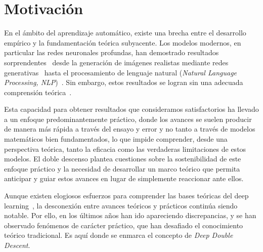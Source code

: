 \section{Motivación}

En el ámbito del aprendizaje automático, existe una brecha entre el desarrollo empírico y la fundamentación teórica subyacente. Los modelos modernos, en particular las redes neuronales profundas, han demostrado resultados sorprendentes~\cite{Sejnowski2020TheUE, He2020RecentAI} desde la generación de imágenes realistas mediante redes generativas~\cite{Elasri2022, Ruthotto2021} hasta el procesamiento de lenguaje natural (\textit{Natural Language Processing, NLP})~\cite{Kamath2019, Lauriola2022}. Sin embargo, estos resultados se logran sin una adecuada comprensión teórica~\cite{Ben-David2009, Grohs2022}.\newline

Esta capacidad para obtener resultados que consideramos satisfactorios ha llevado a un enfoque predominantemente práctico, donde los avances se suelen producir de manera más rápida a través del ensayo y error y no tanto a través de modelos matemáticos bien fundamentados, lo que impide comprender, desde una perspectiva teórica, tanto la eficacia como las verdaderas limitaciones de estos modelos. El doble descenso plantea cuestiones sobre la sostenibilidad de este enfoque práctico y la necesidad de desarrollar un marco teórico que permita anticipar y guiar estos avances en lugar de simplemente reaccionar ante ellos.\newline

Aunque existen elogiosos esfuerzos para comprender las bases teóricas del deep learning~\cite{Zhang2021,Mallat2016, Prince2023, Bishop2023, Grohs2022, Balestriero2018, Michael2018}, la desconexión entre avances teóricos y prácticos continúa siendo notable. Por ello, en los últimos años han ido apareciendo discrepancias, y se han observado fenómenos de carácter práctico, que han desafiado el conocimiento teórico tradicional. Es aquí donde se enmarca el concepto de \emph{Deep Double Descent}.\newline


